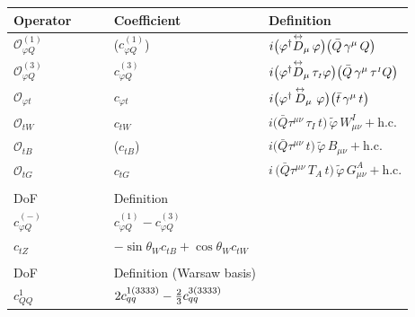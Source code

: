\documentclass[withindex,glossary]{cam-thesis}
\newcommand*{\tmp}[4]{\ensuremath{%
    {#4%
    \ifx\empty#3\empty\ifx\empty#1\empty\else^{#1}\fi\else^{#1(#3)}\fi%
    \ifx\empty#2\empty\else_{#2}\fi}%
}}
\newcommand*{\ccc}[4][]{\tmp{#2}{#3}{#4}{#1{c}}}
\newcommand{\sss}{\scriptscriptstyle}
\newcommand{\OO}{\ensuremath{\mathcal{O}}}
\newcommand{\Op}[1]{\OO_{\sss #1}}
\def\lra#1{\overset{\text{\scriptsize$\leftrightarrow$}}{#1}}
\begin{document}
\begin{table}[htbp]
  \begin{center}
    \renewcommand{\arraystretch}{1.25}
    {\footnotesize
    \begin{tabular}{lll}
      \toprule
      Operator $\qquad$ & Coefficient & Definition \\
                \midrule
    $\Op{\varphi Q}^{(1)}$ & ($c_{\varphi Q}^{(1)}$) & $i\big(\varphi^\dagger\lra{D}_\mu\,\varphi\big)
 \big(\bar{Q}\,\gamma^\mu\,Q\big)$ \\\hline
    $\Op{\varphi Q}^{(3)}$ & $c_{\varphi Q}^{(3)}$  & $i\big(\varphi^\dagger\lra{D}_\mu\,\tau_{\sss I}\varphi\big)
 \big(\bar{Q}\,\gamma^\mu\,\tau^{\sss I}Q\big)$ \\ \hline
    $\Op{\varphi t}$ & $c_{\varphi t}$& $i\big(\varphi^\dagger\,\lra{D}_\mu\,\,\varphi\big)
 \big(\bar{t}\,\gamma^\mu\,t\big)$ \\ \hline
      $\Op{tW}$ & $c_{tW}$ & $i\big(\bar{Q}\tau^{\mu\nu}\,\tau_{\sss I}\,t\big)\,
 \tilde{\varphi}\,W^I_{\mu\nu}
 + \text{h.c.}$ \\  \hline
 $\Op{tB}$ & ($c_{tB}$) &
 $i\big(\bar{Q}\tau^{\mu\nu}\,t\big)
 \,\tilde{\varphi}\,B_{\mu\nu}
 + \text{h.c.}$ \\\hline
    $\Op{t G}$ & $c_{tG}$ & $i\,\big(\bar{Q}\tau^{\mu\nu}\,T_{\sss A}\,t\big)\,
 \tilde{\varphi}\,G^A_{\mu\nu}
 + \text{h.c.}$ \\
 \bottomrule\\
 \toprule
      DoF $\qquad$  & Definition \\
                \midrule
$c_{\varphi Q}^{(-)}$ &  $c_{\varphi Q}^{(1)} - c_{\varphi Q}^{(3)}$ \\
\midrule
$c_{tZ}$ &   $-\sin\theta_W c_{tB} + \cos\theta_W c_{tW} $\\
  \bottomrule\\
 \toprule
          DoF $\qquad$ &  Definition (Warsaw basis) \\
          \midrule
      $c_{QQ}^1$    &   $2\ccc{1}{qq}{3333}-\frac{2}{3}\ccc{3}{qq}{3333}$ \\ \hline

\end{tabular}}
\end{center}
\end{table}
\end{document}
